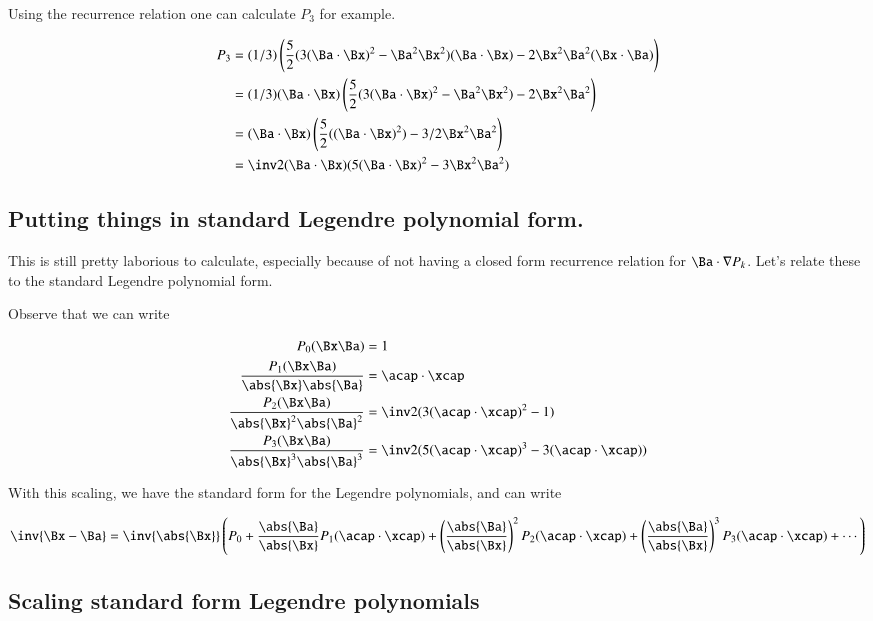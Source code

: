 Using the recurrence relation one can calculate $P_3$ for example.

\begin{align*}
P_3
&=
(1/3)\left(
\frac{5}{2}(3(\Ba \cdot \Bx)^2 -\Ba^2\Bx^2)({\Ba \cdot \Bx})
- 2 \Bx^2 \Ba^2(\Bx \cdot \Ba) \right) \\
&=
(1/3) ({\Ba \cdot \Bx}) \left(
\frac{5}{2}(3(\Ba \cdot \Bx)^2 -\Ba^2\Bx^2)
- 2 \Bx^2 \Ba^2 \right) \\
&=
({\Ba \cdot \Bx}) \left( \frac{5}{2}((\Ba \cdot \Bx)^2 ) - 3/2 \Bx^2 \Ba^2 \right) \\
&=
\half({\Ba \cdot \Bx}) ( {5}(\Ba \cdot \Bx)^2 - 3 \Bx^2 \Ba^2 ) \\
\end{align*}

\subsection{ Putting things in standard Legendre polynomial form.}

This is still pretty laborious to calculate, especially because of not having a closed form recurrence
relation for $\agrad P_k$.  Let's relate these to the standard Legendre polynomial form.

Observe that we can write

\begin{align*}
P_0(\bxa) &= 1 \\
\frac{P_1(\bxa)}{\abs{\Bx} \abs{\Ba}} &= \costheta \\
\frac{P_2(\bxa)}{\abs{\Bx}^2 \abs{\Ba}^2} &= \half(3(\costheta)^2 - 1) \\
\frac{P_3(\bxa)}{\abs{\Bx}^3 \abs{\Ba}^3} &= \half ( {5}(\costheta)^3 - 3 {(\costheta)} ) \\
\end{align*}

With this scaling, we have the standard form for the Legendre polynomials, and can write

\[
\inv{\Bx-\Ba} = \inv{\abs{\Bx}}\left(
P_0 
+ \frac{\abs{\Ba}}{\abs{\Bx}} P_1(\costheta)
+ \left(\frac{\abs{\Ba}}{\abs{\Bx}}\right)^2 P_2(\costheta)
+ \left(\frac{\abs{\Ba}}{\abs{\Bx}}\right)^3 P_3(\costheta)
+ \cdots \right)
\]

\subsection{ Scaling standard form Legendre polynomials }


